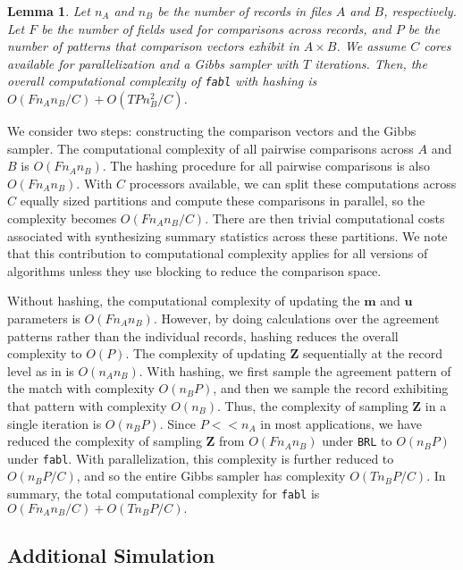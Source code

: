 \documentclass[12pt,letterpaper]{article}
\newcommand{\1}[1]{\mathbb{I}\!\left[#1\right]} %
\newtheorem{lemma}{Lemma}
\begin{document}
\begin{lemma}\label{lemma:complexity}
		Let $n_A$ and $n_B$ be the number of records in files $A$ and $B$, respectively. Let $F$ be the number of fields used for comparisons across records, and $P$ be the number of patterns that comparison vectors exhibit in $A \times B$. We assume $C$ cores available for parallelization and a Gibbs sampler with $T$ iterations. Then, the overall computational complexity of \texttt{fabl} with hashing is $O(F n_A n_B /C) + O(T P n_B^2/ C)$.
\end{lemma}
	
		We consider two steps: constructing the comparison vectors and the Gibbs sampler. The computational complexity of all pairwise comparisons across $A$ and $B$ is $O(F n_A n_B)$. The hashing procedure for all pairwise comparisons is also $O(F n_A n_B)$. With $C$ processors available, we can split these computations across $C$ equally sized partitions and compute these comparisons in parallel, so the complexity becomes $O(F n_A n_B /C)$. There are then trivial computational costs associated with synthesizing summary statistics across these partitions. We note that this contribution to computational complexity applies for all versions of \cite{fellegi_theory_1969} algorithms unless they use blocking to reduce the comparison space.
			
			Without hashing, the computational complexity of updating the $\bm{m}$ and $\bm{u}$ parameters is $O(F n_A n_B)$. However, by doing calculations over the agreement patterns rather than the individual records, hashing reduces the overall complexity to $O(P)$. The complexity of updating $\bm{Z}$ sequentially at the record level as in \cite{sadinle_bayesian_2017} is $O(n_A n_B)$. With hashing, we first sample the agreement pattern of the match with complexity $O(n_B P)$, and then we sample the record exhibiting that pattern with complexity $O(n_B)$. Thus, the complexity of sampling $\bm{Z}$ in a single iteration is $O(n_B P)$. Since $P << n_A$ in most applications, we have reduced the complexity of sampling $\bm{Z}$ from $O(F n_A n_B)$ under \texttt{BRL} to $O(n_B P)$ under \texttt{fabl}. With parallelization, this complexity is further reduced to $O(n_B P /C)$, and so the entire Gibbs sampler has complexity $O(T n_B P / C).$
			In summary, the total computational complexity for \texttt{fabl} is $O(F n_A n_B / C) + O(T n_B P / C).$

\subsection{Additional Simulation}\label{app:simulation-2}
\end{document}

